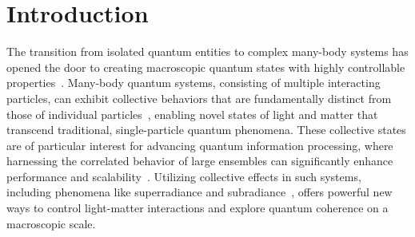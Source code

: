 \documentclass[aps,prl,twocolumn,superscriptaddress,showpacs,amsmath,amssymb]{revtex4-2}
\begin{document}
\maketitle

\section{Introduction}\label{sec:intro}

%


The transition from isolated quantum entities to complex many-body systems has opened the door to creating macroscopic quantum states with highly controllable properties~\cite{friedman2000quantum,mazurenko2017cold,gross2017quantum,ebadi2021quantum,tao2024high}. 
Many-body quantum systems, consisting of multiple interacting particles, can exhibit collective behaviors that are fundamentally distinct from those of individual particles~\cite{schafer2020tools,gross2017quantum,amico2008entanglement}, enabling novel states of light and matter that transcend traditional, single-particle quantum phenomena. 
These collective states are of particular interest for advancing quantum information processing, where harnessing the correlated behavior of large ensembles can significantly enhance performance and scalability~\cite{asenjo-garcia_exponential_2017,ballantine_quantum_2021,guimond_subradiant_2019}. 
Utilizing collective effects in such systems, including phenomena like superradiance and subradiance~\cite{dicke1954coherence,gross1982superradiance,nefedkin2017superradiance,masson2024dicke}, offers powerful new ways to control light-matter interactions and explore quantum coherence on a macroscopic scale.
\end{document}
